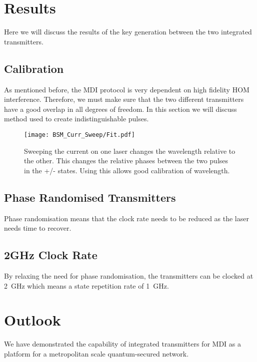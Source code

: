 \section{Results}

Here we will discuss the results of the key generation between the two integrated transmitters.

\subsection{Calibration}

As mentioned before, the \ac{MDI} protocol is very dependent on high fidelity \ac{HOM} interference. Therefore, we must make sure that the two different transmitters have a good overlap in all degrees of freedom. In this section we will discuss method used to create indistinguishable pulses.

\begin{figure}[tbp]
	\centering
	\texttt{[image: BSM\_Curr\_Sweep/Fit.pdf]}
	\caption[Laser current-error sweep]{Sweeping the current on one laser changes the wavelength relative to the other. This changes the relative phases between the two pulses in the +/- states. Using this allows good calibration of wavelength.}
	\label{fig:wavelength_cal}
\end{figure}


\subsection{Phase Randomised Transmitters}

Phase randomisation means that the clock rate needs to be reduced as the laser needs time to recover. 

\subsection{2GHz Clock Rate}

By relaxing the need for phase randomisation, the transmitters can be clocked at \SI{2}{GHz} which means a state repetition rate of \SI{1}{GHz}.

\section{Outlook}

We have demonstrated the capability of integrated transmitters for \acl{MDI} as a platform for a metropolitan scale quantum-secured network. 

